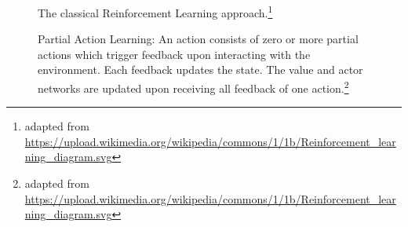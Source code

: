 \documentclass[sigconf]{acmart}
\begin{document}
\begin{figure}
\begin{minipage}{\columnwidth}

\caption{The classical Reinforcement Learning approach.\protect\footnote{adapted from \url{https://upload.wikimedia.org/wikipedia/commons/1/1b/Reinforcement_learning_diagram.svg}}}
\label{fig:reinforcement}
\end{minipage}
\end{figure}

\begin{figure}
\begin{minipage}{\columnwidth}

\caption{Partial Action Learning: An action consists of zero or more partial actions which trigger feedback upon interacting with the environment. Each feedback updates the state. The value and actor networks are updated upon receiving all feedback of one action.\protect\footnote{adapted from \url{https://upload.wikimedia.org/wikipedia/commons/1/1b/Reinforcement_learning_diagram.svg}}}
\label{fig:pal}
\end{minipage}
\end{figure}
\end{document}
